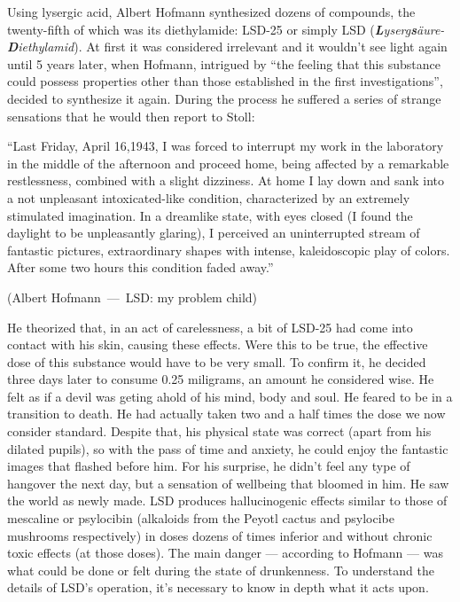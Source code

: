 Using lysergic acid, Albert Hofmann synthesized dozens of compounds, the twenty-fifth of which was its diethylamide: LSD-25 or simply LSD (\textit{\textbf{L}yserg\textbf{s}äure-\textbf{D}iethylamid}). At first it was considered irrelevant and it wouldn't see light again until 5 years later, when Hofmann, intrigued by \enquote{the feeling that this substance could possess properties other than those established in the first investigations}, decided to synthesize it again. During the process he suffered a series of strange sensations that he would then report to Stoll:

\let\oldquote\quote
\let\endoldquote\endquote
\renewenvironment{quote}[2][]
  {\if\relax\detokenize{#1}\relax
     \def\quoteauthor{#2}%
   \else
     \def\quoteauthor{#2~---~#1}%
   \fi
   \oldquote}
  {\par\nobreak\smallskip\hfill(\quoteauthor)%
   \endoldquote\addvspace{\bigskipamount}}

\begin{quote}[LSD: my problem child]{Albert Hofmann}
	\enquote{Last Friday, April 16,1943, I was forced to interrupt my work in the laboratory in the middle of the afternoon and proceed home, being affected by a remarkable restlessness, combined with a slight dizziness. At home I lay down and sank into a not unpleasant intoxicated-like condition, characterized by an extremely stimulated imagination. In a dreamlike state, with eyes closed (I found the daylight to be unpleasantly glaring), I perceived an uninterrupted stream of fantastic pictures, extraordinary shapes with intense, kaleidoscopic play of colors. After some two hours this condition faded away.}
\end{quote}

He theorized that, in an act of carelessness, a bit of LSD-25 had come into contact with his skin, causing these effects. Were this to be true, the effective dose of this substance would have to be very small. To confirm it, he decided three days later to consume 0.25 miligrams, an amount he considered wise. He felt as if a devil was geting ahold of his mind, body and soul. He feared to be in a transition to death. He had actually taken two and a half times the dose we now consider standard. Despite that, his physical state was correct (apart from his dilated pupils), so with the pass of time and anxiety, he could enjoy the fantastic images that flashed before him. For his surprise, he didn't feel any type of hangover the next day, but a sensation of wellbeing that bloomed in him. He saw the world as newly made. LSD produces hallucinogenic effects similar to those of mescaline or psylocibin (alkaloids from the Peyotl cactus and psylocibe mushrooms respectively) in doses dozens of times inferior and without chronic toxic effects (at those doses). The main danger --- according to Hofmann --- was what could be done or felt during the state of drunkenness. To understand the details of LSD's operation, it's necessary to know in depth what it acts upon.

\newpage
